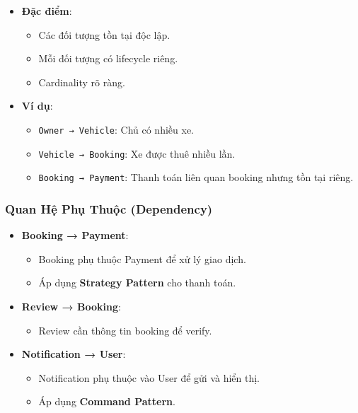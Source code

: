 \begin{itemize}
    \item \textbf{Đặc điểm}:
    \begin{itemize}
        \item Các đối tượng tồn tại độc lập.
        \item Mỗi đối tượng có lifecycle riêng.
        \item Cardinality rõ ràng.
    \end{itemize}

    \item \textbf{Ví dụ}:
    \begin{itemize}
        \item \texttt{Owner → Vehicle}: Chủ có nhiều xe.
        \item \texttt{Vehicle → Booking}: Xe được thuê nhiều lần.
        \item \texttt{Booking → Payment}: Thanh toán liên quan booking nhưng tồn tại riêng.
    \end{itemize}
\end{itemize}

\subsubsection{Quan Hệ Phụ Thuộc (Dependency)}

\begin{itemize}
    \item \textbf{Booking → Payment}:
    \begin{itemize}
        \item Booking phụ thuộc Payment để xử lý giao dịch.
        \item Áp dụng \textbf{Strategy Pattern} cho thanh toán.
    \end{itemize}

    \item \textbf{Review → Booking}:
    \begin{itemize}
        \item Review cần thông tin booking để verify.
    \end{itemize}

    \item \textbf{Notification → User}:
    \begin{itemize}
        \item Notification phụ thuộc vào User để gửi và hiển thị.
        \item Áp dụng \textbf{Command Pattern}.
    \end{itemize}
\end{itemize}

